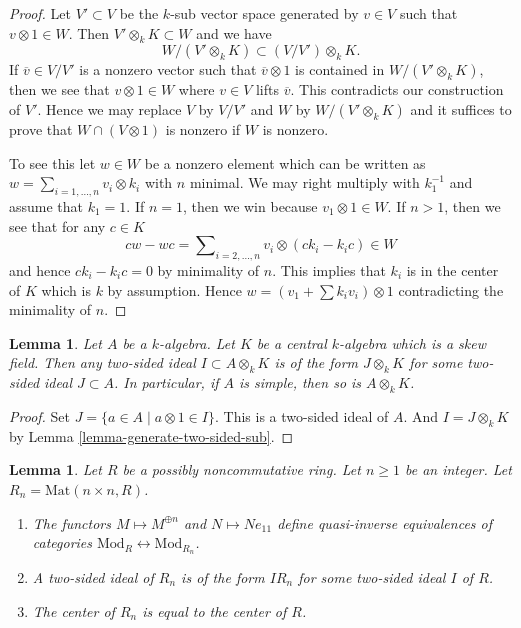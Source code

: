 \documentclass{stacks-project}
\theoremstyle{plain}
\newtheorem{lemma}[subsection]{Lemma}
\theoremstyle{definition}
\theoremstyle{remark}
\numberwithin{equation}{subsection}
\begin{document}
\begin{proof}
Let $V' \subset V$ be the $k$-sub vector space generated by $v \in V$
such that $v \otimes 1 \in W$. Then $V' \otimes_k K \subset W$ and
we have
$$
W/(V' \otimes_k K)  \subset  (V/V') \otimes_k K.
$$
If $\overline{v} \in V/V'$ is a nonzero vector such that
$\overline{v} \otimes 1$ is contained in $W/(V' \otimes_k K)$,
then we see that $v \otimes 1 \in W$ where $v \in V$ lifts $\overline{v}$.
This contradicts our construction of $V'$. Hence we may replace
$V$ by $V/V'$ and $W$ by $W/(V' \otimes_k K)$ and it suffices to prove
that $W \cap (V \otimes 1)$ is nonzero if $W$ is nonzero.

\medskip\noindent
To see this let $w \in W$ be a nonzero element which can be written
as $w = \sum_{i = 1, \ldots, n} v_i \otimes k_i$ with $n$ minimal.
We may right multiply with $k_1^{-1}$ and assume that $k_1 = 1$.
If $n = 1$, then we win because $v_1 \otimes 1 \in W$.
If $n > 1$, then we see that for any $c \in K$
$$
c w - w c = \sum\nolimits_{i = 2, \ldots, n} v_i \otimes (c k_i - k_i c) \in W
$$
and hence $c k_i - k_i c = 0$ by minimality of $n$.
This implies that $k_i$ is in the center of $K$ which is $k$ by
assumption. Hence $w = (v_1 + \sum k_i v_i) \otimes 1$ contradicting
the minimality of $n$.
\end{proof}

\begin{lemma}
\label{lemma-generate-two-sided-ideal}
Let $A$ be a $k$-algebra. Let $K$ be a central $k$-algebra
which is a skew field. Then any two-sided ideal $I \subset A \otimes_k K$
is of the form $J \otimes_k K$ for some two-sided ideal $J \subset A$.
In particular, if $A$ is simple, then so is $A \otimes_k K$.
\end{lemma}

\begin{proof}
Set $J = \{a \in A \mid a \otimes 1 \in I\}$. This is a two-sided ideal
of $A$. And $I = J \otimes_k K$ by
Lemma \ref{lemma-generate-two-sided-sub}.
\end{proof}

\begin{lemma}
\label{lemma-matrix-algebras}
Let $R$ be a possibly noncommutative ring. Let $n \geq 1$ be an integer.
Let $R_n = \text{Mat}(n \times n, R)$.
\begin{enumerate}
\item The functors $M \mapsto M^{\oplus n}$ and
$N \mapsto Ne_{11}$ define quasi-inverse equivalences of categories
$\text{Mod}_R \leftrightarrow \text{Mod}_{R_n}$.
\item A two-sided ideal of $R_n$ is of the form $IR_n$ for some
two-sided ideal $I$ of $R$.
\item The center of $R_n$ is equal to the center of $R$.
\end{enumerate}
\end{lemma}
\end{document}
